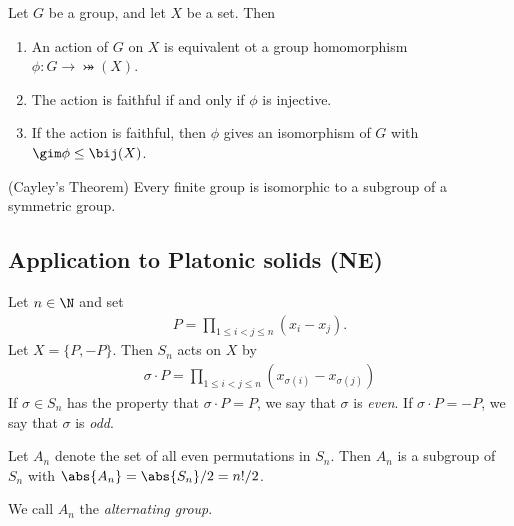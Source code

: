 \documentclass{article}
\begin{document}
\begin{theorem}
    Let $G$ be a group, and let $X$ be a set. Then
    \begin{enumerate}
        \item An action of $G$ on $X$ is equivalent ot a group homomorphism $\phi:G\to\bij(X)$.
        \item The action is faithful if and only if $\phi$ is injective.
        \item If the action is faithful, then $\phi$ gives an isomorphism of $G$ with $\gim\phi\leq\bij(X)$.
    \end{enumerate}
\end{theorem}

\begin{corollary}(Cayley's Theorem)
    Every finite group is isomorphic to a subgroup of a symmetric group.
\end{corollary}

\subsection{Application to Platonic solids (NE)}

\begin{definition}
    Let $n\in\N$ and set
    \begin{align*}
        P=\prod_{1\leq i<j\leq n}(x_i-x_j).
    \end{align*}
    Let $X=\{P,-P\}$. Then $S_n$ acts on $X$ by
    \begin{align*}
        \sigma\cdot P= \prod_{1\leq i < j \leq n} (x_{\sigma(i)}-x_{\sigma(j)})
    \end{align*}
    If $\sigma\in S_n$ has the property that $\sigma\cdot P=P$,
    we say that $\sigma$ is \emph{even}. If $\sigma\cdot P=-P$,
    we say that $\sigma$ is \emph{odd}.
\end{definition}

\setcounter{theorem}{3}
\begin{theorem}
    Let $A_n$ denote the set of all even permutations in $S_n$.
    Then $A_n$ is a subgroup of $S_n$ with $\abs{A_n}=
        \abs{S_n}/2 = n!/2$.
\end{theorem}

\begin{definition}
    We call $A_n$ the \emph{alternating group}.
\end{definition}
\end{document}
